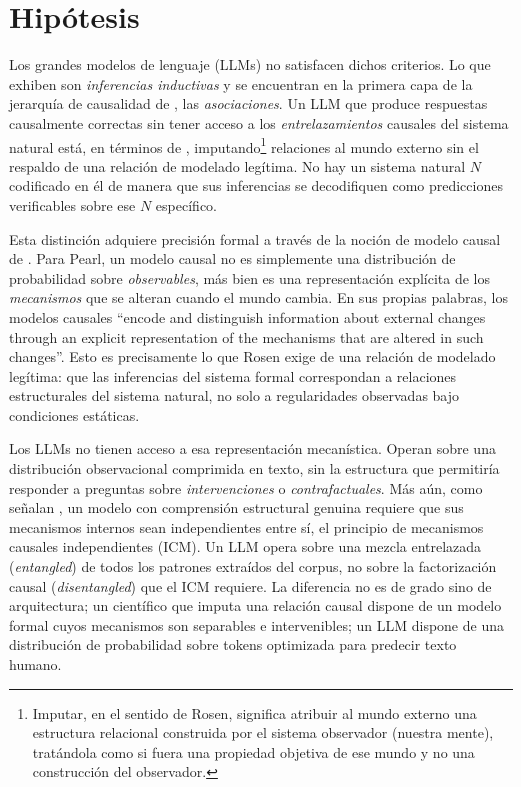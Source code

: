\section{Hipótesis}

Los grandes modelos de lenguaje (LLMs) no satisfacen dichos criterios. 
Lo que exhiben son \textit{inferencias inductivas} 
\parencite{fawkes2024fragility} y se encuentran en la primera capa de 
la jerarquía de causalidad de \textcite{pearl2018theoretical}, las 
\textit{asociaciones}. Un LLM que produce respuestas causalmente 
correctas sin tener acceso a los \textit{entrelazamientos} causales del sistema natural 
está, en términos de \textcite{rosen2012anticipatory}, 
imputando\footnote{Imputar, en el sentido de Rosen, significa atribuir 
al mundo externo una estructura relacional construida por el sistema 
observador (nuestra mente), tratándola como si fuera una propiedad objetiva de ese 
mundo y no una construcción del observador.} relaciones al mundo 
externo sin el respaldo de una relación de modelado legítima. No hay 
un sistema natural $N$ codificado en él de manera que sus inferencias 
se decodifiquen como predicciones verificables sobre ese $N$ 
específico. 

Esta distinción adquiere precisión formal a través de la noción de 
modelo causal de \textcite{pearl2000causality}. Para Pearl, un modelo 
causal no es simplemente una distribución de probabilidad sobre 
\textit{observables}, más bien es una representación explícita de los \textit{mecanismos} 
que se alteran cuando el mundo cambia. En sus propias palabras, los 
modelos causales \textcite[p.~203]{pearl2000causality} ``encode and distinguish information about external changes through an explicit representation of the mechanisms that are 
altered in such changes''. Esto es precisamente lo que Rosen exige de 
una relación de modelado legítima: que las inferencias del sistema 
formal correspondan a relaciones estructurales del sistema natural, no 
solo a regularidades observadas bajo condiciones estáticas.

Los LLMs no tienen acceso a esa representación mecanística. Operan 
sobre una distribución observacional comprimida en texto, sin la estructura que permitiría 
responder a preguntas sobre \textit{intervenciones} o \textit{contrafactuales}. Más aún, como señalan 
\textcite{scholkopf2021toward}, un modelo con comprensión estructural 
genuina requiere que sus mecanismos internos sean independientes entre 
sí, el principio de mecanismos causales independientes (ICM). Un LLM 
opera sobre una mezcla entrelazada (\textit{entangled}) de todos los 
patrones extraídos del corpus, no sobre la factorización causal 
(\textit{disentangled}) que el ICM requiere. La diferencia no es de grado sino de 
arquitectura; un científico que imputa una relación causal dispone de 
un modelo formal cuyos mecanismos son separables e intervenibles; un 
LLM dispone de una distribución de probabilidad sobre tokens optimizada 
para predecir texto humano.

